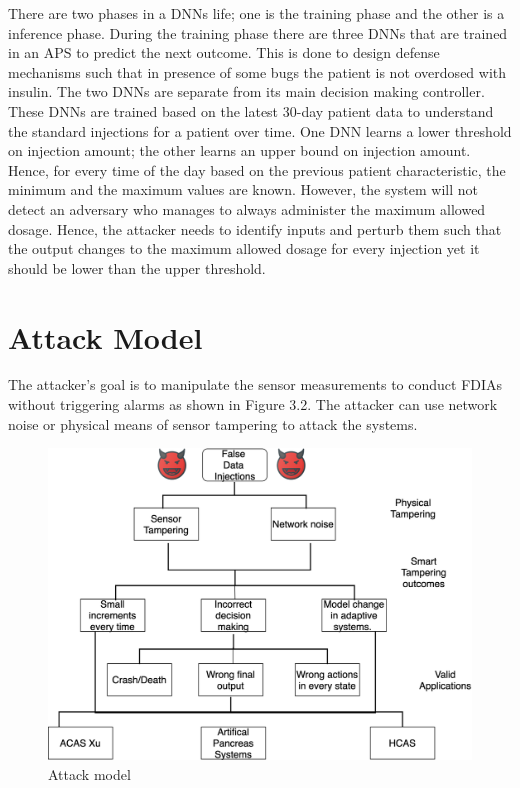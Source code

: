There are two phases in a \ac{DNN}s life; one is the training phase and the other is a inference phase. 
During the training phase there are three \ac{DNN}s that are trained in an \ac{APS} to predict the next outcome. 
This is done to design defense mechanisms such that in presence of some bugs the patient is not overdosed with insulin.  
The two \ac{DNN}s are separate from its main decision making controller. 
These \ac{DNN}s are trained based on the latest 30-day patient data to understand the standard injections for a patient over time. 
One \ac{DNN} learns a lower threshold on injection amount; the other learns an upper bound on injection amount. 
Hence, for every time of the day based on the previous patient characteristic, the minimum and the maximum values are known. 
However, the system will not detect  an adversary  who manages to always administer the maximum allowed dosage.  
Hence, the attacker needs to identify inputs and  perturb them  such that the output changes to the maximum  allowed dosage for every injection yet it should be lower than the upper threshold. 



\section{Attack Model}
The attacker's goal is to manipulate the sensor measurements to conduct FDIAs without triggering alarms as shown in Figure 3.2. 
The attacker can use network noise or physical means of sensor tampering to attack the systems. 
 
\begin{figure}
	\centering
	\includegraphics[width=0.7\linewidth]{Images/Attackmodelphysical}
	\caption{Attack model}
	\label{fig:attackmodelphysical}
\end{figure}

